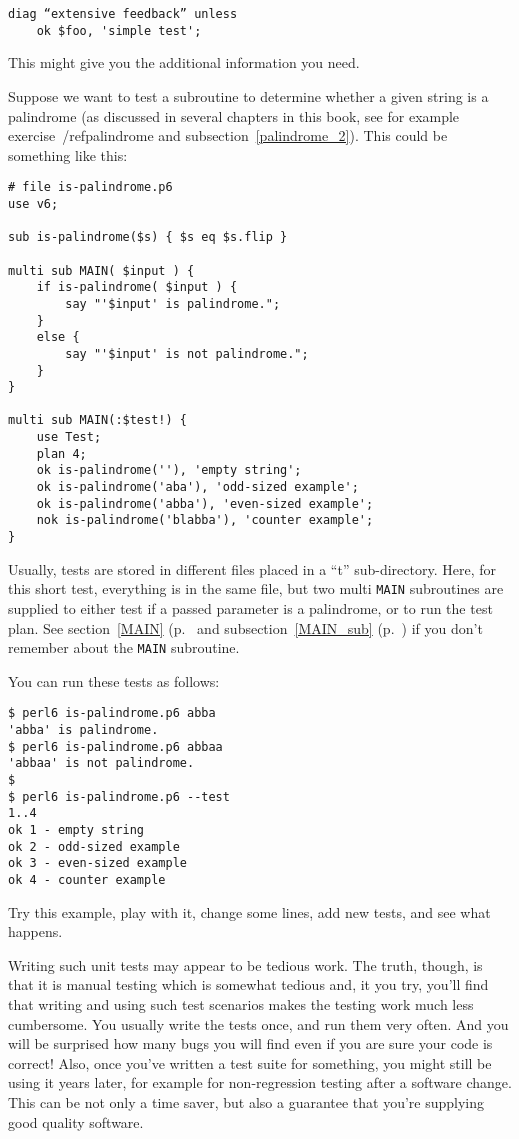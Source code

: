 \begin{verbatim}
diag “extensive feedback” unless
    ok $foo, 'simple test';
\end{verbatim}

This might give you the additional information you need.

Suppose we want to test a subroutine to determine whether a 
given string is a palindrome (as discussed in several chapters 
in this book, see for example exercise~/ref{palindrome} and 
subsection~\ref{palindrome_2}). This could be something 
like this:

\begin{verbatim}
# file is-palindrome.p6
use v6;

sub is-palindrome($s) { $s eq $s.flip }

multi sub MAIN( $input ) {
    if is-palindrome( $input ) {
        say "'$input' is palindrome.";
    }
    else {
        say "'$input' is not palindrome.";
    }
}

multi sub MAIN(:$test!) {
    use Test;
    plan 4;
    ok is-palindrome(''), 'empty string';
    ok is-palindrome('aba'), 'odd-sized example';
    ok is-palindrome('abba'), 'even-sized example';
    nok is-palindrome('blabba'), 'counter example';
}
\end{verbatim}

Usually, tests are stored in different files placed in a ``t'' 
sub-directory. Here, for this short test, everything is in the 
same file, but two multi {\tt MAIN} subroutines are supplied 
to either test if a passed parameter is a palindrome, or to 
run the test plan. See section~\ref{MAIN} (p.~\pageref{MAIN} and 
subsection~\ref{MAIN_sub} (p.~\pageref{MAIN_sub}) if you don't 
remember about the {\tt MAIN} subroutine.

You can run these tests as follows:

\begin{verbatim}
$ perl6 is-palindrome.p6 abba
'abba' is palindrome.
$ perl6 is-palindrome.p6 abbaa
'abbaa' is not palindrome.
$
$ perl6 is-palindrome.p6 --test
1..4
ok 1 - empty string
ok 2 - odd-sized example
ok 3 - even-sized example
ok 4 - counter example
\end{verbatim}

Try this example, play with it, change some lines, add 
new tests, and see what happens.

Writing such unit tests may appear to be tedious work. 
The truth, though, is that it is manual testing which is 
somewhat tedious and, it you try, you'll find that 
writing and using such test scenarios makes the testing 
work much less cumbersome. You usually write the tests 
once, and run them very often. And you will be surprised 
how many bugs you will find even if you are sure your 
code is correct! Also, once you've written 
a test suite for something, you might still be using it 
years later, for example for non-regression testing after 
a software change. This can be not only a time saver, but 
also a guarantee that you're supplying good quality software.

